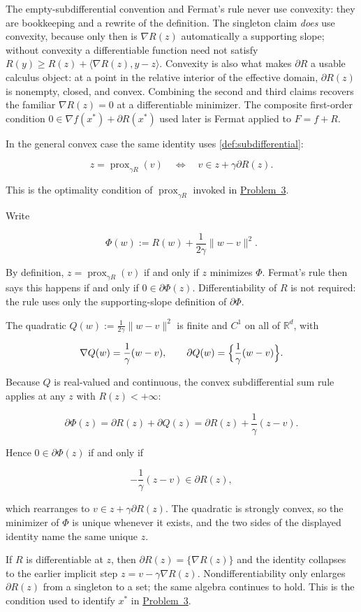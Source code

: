 \documentclass[11pt,a4paper]{article}
\DeclareMathOperator{\prox}{prox}
\newcommand{\jump}[2]{\hyperref[#1]{#2}}
\theoremstyle{definition}
\begin{document}
\begin{note}
The empty-subdifferential convention and Fermat's rule never use convexity: they are bookkeeping and a rewrite of the definition. The singleton claim \emph{does} use convexity, because only then is $\nabla R(z)$ automatically a supporting slope; without convexity a differentiable function need not satisfy $R(y)\geq R(z)+\langle\nabla R(z),y-z\rangle$. Convexity is also what makes $\partial R$ a usable calculus object: at a point in the relative interior of the effective domain, $\partial R(z)$ is nonempty, closed, and convex. Combining the second and third claims recovers the familiar $\nabla R(z)=0$ at a differentiable minimizer. The composite first-order condition $0\in\nabla f(x^*)+\partial R(x^*)$ used later is Fermat applied to $F=f+R$.
\end{note}

In the general convex case the same identity uses \cref{def:subdifferential}:

\[
z=\prox_{\gamma R}(v)
\quad\Longleftrightarrow\quad
v\in z+\gamma\partial R(z).
\]

This is the optimality condition of $\prox_{\gamma R}$ invoked in \jump{prob:spr2025-opt-3}{Problem~3}.

\begin{note}\label{note:prox-foc}
Write

\[
\Phi(w):=R(w)+\frac{1}{2\gamma}\|w-v\|^2.
\]

By definition, $z=\prox_{\gamma R}(v)$ if and only if $z$ minimizes $\Phi$. Fermat's rule then says this happens if and only if $0\in\partial\Phi(z)$. Differentiability of $R$ is not required: the rule uses only the supporting-slope definition of $\partial\Phi$.

The quadratic $Q(w):=\frac{1}{2\gamma}\|w-v\|^2$ is finite and $C^1$ on all of $\mathbb{R}^d$, with

\[
\nabla Q(w)=\frac{1}{\gamma}(w-v),
\qquad
\partial Q(w)=\Bigl\{\frac{1}{\gamma}(w-v)\Bigr\}.
\]

Because $Q$ is real-valued and continuous, the convex subdifferential sum rule applies at any $z$ with $R(z)<+\infty$:

\[
\partial\Phi(z)
=\partial R(z)+\partial Q(z)
=\partial R(z)+\frac{1}{\gamma}(z-v).
\]

Hence $0\in\partial\Phi(z)$ if and only if

\[
-\frac{1}{\gamma}(z-v)\in\partial R(z),
\]

which rearranges to $v\in z+\gamma\partial R(z)$. The quadratic is strongly convex, so the minimizer of $\Phi$ is unique whenever it exists, and the two sides of the displayed identity name the same unique $z$.

If $R$ is differentiable at $z$, then $\partial R(z)=\{\nabla R(z)\}$ and the identity collapses to the earlier implicit step $z=v-\gamma\nabla R(z)$. Nondifferentiability only enlarges $\partial R(z)$ from a singleton to a set; the same algebra continues to hold. This is the condition used to identify $x^*$ in \jump{prob:spr2025-opt-3}{Problem~3}.
\end{note}
\end{document}
